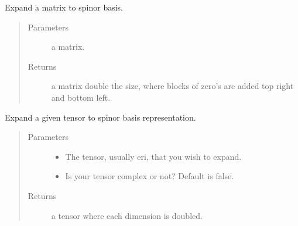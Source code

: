 \documentclass[letterpaper,10pt,english]{sphinxmanual}
\begin{document}
\begin{fulllineitems}
\label{\detokenize{transform:hf.utilities.transform.expand_matrix}}
Expand a matrix to spinor basis.
\begin{quote}\begin{description}
\item[{Parameters}] \leavevmode
{} \textendash{} a matrix.

\item[{Returns}] \leavevmode
a matrix double the size, where blocks of zero’s are added top right and bottom left.

\end{description}\end{quote}

\end{fulllineitems}


\begin{fulllineitems}
\label{\detokenize{transform:hf.utilities.transform.expand_tensor}}
Expand a given tensor to spinor basis representation.
\begin{quote}\begin{description}
\item[{Parameters}] \leavevmode\begin{itemize}
\item {} 
 \textendash{} The tensor, usually eri, that you wish to expand.

\item {} 
 \textendash{} Is your tensor complex or not? Default is false.

\end{itemize}

\item[{Returns}] \leavevmode
a tensor where each dimension is doubled.

\end{description}\end{quote}

\end{fulllineitems}
\end{document}
